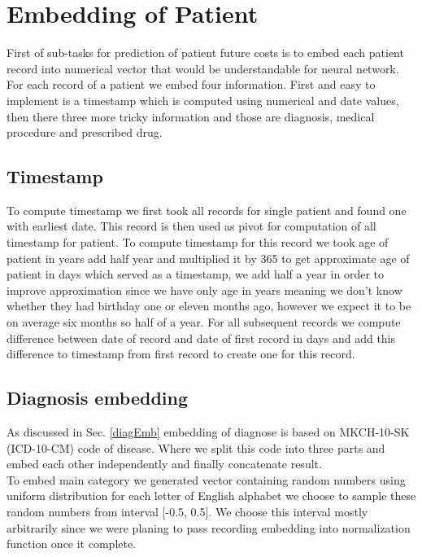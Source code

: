 
\section{Embedding of Patient}
\label{embeddingImple}

First of sub-tasks for prediction of patient future costs is to embed each patient record into numerical vector that would be understandable for neural network. For each record of a patient we embed four information. First and easy to implement is a timestamp which is computed using numerical and date values, then there three more tricky information and those are diagnosis, medical procedure and prescribed drug. 

\subsection{Timestamp}

To compute timestamp we first took all records for single patient and found one with earliest date. This record is then used as pivot for computation of all timestamp for patient. To compute timestamp for this record we took age of patient in years add half year and multiplied it by 365 to get approximate age of patient in days which served as a timestamp, we add half a year in order to improve approximation since we have only age in years meaning we don't know whether they had birthday one or eleven months ago, however we expect it to be on average six months so half of a year. For all subsequent records we compute difference between date of record and date of first record in days and add this difference to timestamp from first record to create one for this record. 

\subsection{Diagnosis embedding}

As discussed in Sec. \ref{diagEmb} embedding of diagnose is based on MKCH-10-SK (ICD-10-CM) code of disease. Where we split this code into three parts and embed each other independently and finally concatenate result.
\\

To embed main category we generated vector containing random numbers using uniform distribution for each letter of English alphabet we choose to sample these random numbers from interval [-0.5, 0.5]. We choose this interval mostly arbitrarily since we were planing to pass recording embedding into normalization function once it complete.
\\

